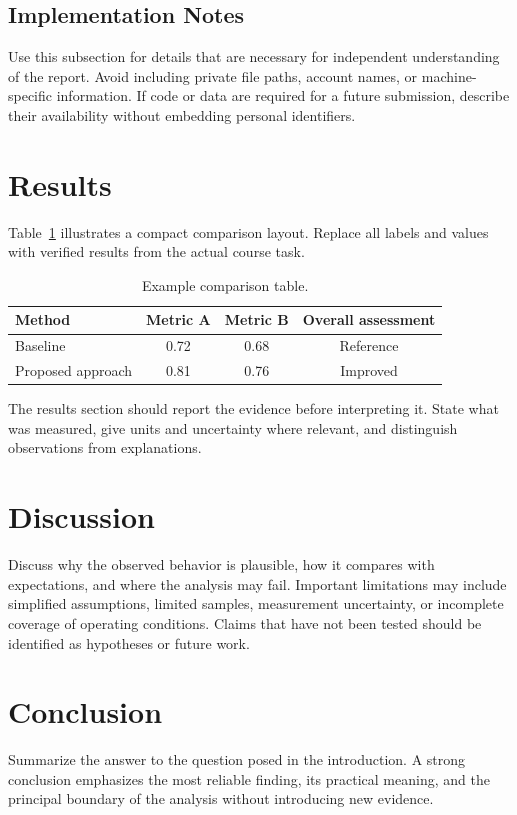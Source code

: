 \documentclass[11pt,a4paper]{article}
\begin{document}
\subsection{Implementation Notes}
Use this subsection for details that are necessary for independent understanding of the report. Avoid including private file paths, account names, or machine-specific information. If code or data are required for a future submission, describe their availability without embedding personal identifiers.

\section{Results}
Table~\ref{tab:example} illustrates a compact comparison layout. Replace all labels and values with verified results from the actual course task.

\begin{table}[htbp]
  \centering
  \caption{Example comparison table.}
  \label{tab:example}
  \begin{tabular}{lccc}
    \toprule
    Method & Metric A & Metric B & Overall assessment \\
    \midrule
    Baseline & 0.72 & 0.68 & Reference \\
    Proposed approach & 0.81 & 0.76 & Improved \\
    \bottomrule
  \end{tabular}
\end{table}

The results section should report the evidence before interpreting it. State what was measured, give units and uncertainty where relevant, and distinguish observations from explanations.

\section{Discussion}
Discuss why the observed behavior is plausible, how it compares with expectations, and where the analysis may fail. Important limitations may include simplified assumptions, limited samples, measurement uncertainty, or incomplete coverage of operating conditions. Claims that have not been tested should be identified as hypotheses or future work.

\section{Conclusion}
Summarize the answer to the question posed in the introduction. A strong conclusion emphasizes the most reliable finding, its practical meaning, and the principal boundary of the analysis without introducing new evidence.
\end{document}
